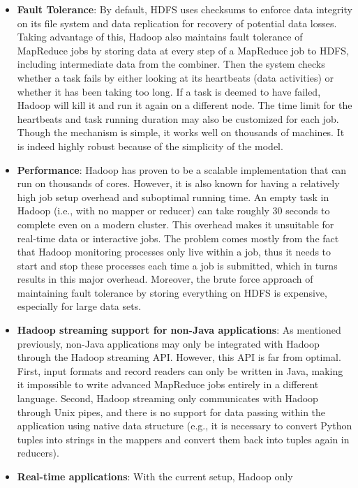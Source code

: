 \documentclass[]{krantz}
\begin{document}
\begin{itemize}
\item
  \textbf{Fault Tolerance}: By default, HDFS uses checksums to enforce
  data integrity on its file system and data replication for recovery of
  potential data losses. Taking advantage of this, Hadoop also maintains
  fault tolerance of MapReduce jobs by storing data at every step of a
  MapReduce job to HDFS, including intermediate data from the combiner.
  Then the system checks whether a task fails by either looking at its
  heartbeats (data activities) or whether it has been taking too long.
  If a task is deemed to have failed, Hadoop will kill it and run it
  again on a different node. The time limit for the heartbeats and task
  running duration may also be customized for each job. Though the
  mechanism is simple, it works well on thousands of machines. It is
  indeed highly robust because of the simplicity of the model.
\item
  \textbf{Performance}: Hadoop has proven to be a scalable
  implementation that can run on thousands of cores. However, it is also
  known for having a relatively high job setup overhead and suboptimal
  running time. An empty task in Hadoop (i.e., with no mapper or
  reducer) can take roughly 30 seconds to complete even on a modern
  cluster. This overhead makes it unsuitable for real-time data or
  interactive jobs. The problem comes mostly from the fact that Hadoop
  monitoring processes only live within a job, thus it needs to start
  and stop these processes each time a job is submitted, which in turns
  results in this major overhead. Moreover, the brute force approach of
  maintaining fault tolerance by storing everything on HDFS is
  expensive, especially for large data sets.
\item
  \textbf{Hadoop streaming support for non-Java applications}: As
  mentioned previously, non-Java applications may only be integrated
  with Hadoop through the Hadoop streaming API. However, this API is far
  from optimal. First, input formats and record readers can only be
  written in Java, making it impossible to write advanced MapReduce jobs
  entirely in a different language. Second, Hadoop streaming only
  communicates with Hadoop through Unix pipes, and there is no support
  for data passing within the application using native data structure
  (e.g., it is necessary to convert Python tuples into strings in the
  mappers and convert them back into tuples again in reducers).
\item
  \textbf{Real-time applications}: With the current setup, Hadoop only

\end{itemize}
\end{document}
